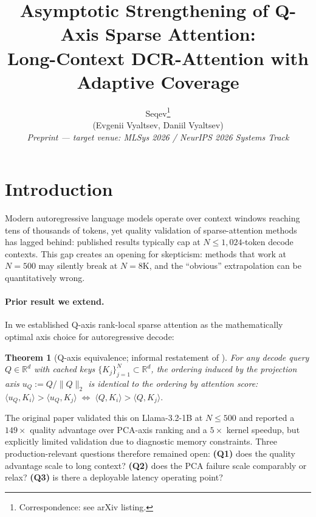 \documentclass[11pt]{article}
\title{
  \large \bfseries
  Asymptotic Strengthening of Q-Axis Sparse Attention:\\
  Long-Context DCR-Attention with Adaptive Coverage
}
\author{%
  Seqev\thanks{Correspondence: see arXiv listing.} \\
  \normalsize (Evgenii Vyaltsev, Daniil Vyaltsev) \\[2pt]
  \small\itshape Preprint --- target venue: MLSys 2026 / NeurIPS 2026 Systems Track
}
\date{}
\newtheorem{theorem}{Theorem}
\theoremstyle{definition}
\theoremstyle{remark}
\theoremstyle{plain}
\newcommand{\R}{\mathbb{R}}
\begin{document}
\maketitle



\section{Introduction}

Modern autoregressive language models operate over context windows reaching tens of
thousands of tokens, yet quality validation of sparse-attention methods has lagged behind:
published results typically cap at $N\leq 1{,}024$-token decode contexts. This gap creates an opening for skepticism: methods that work at $N\!=\!500$ may silently
break at $N\!=\!8\text{K}$, and the ``obvious'' extrapolation can be quantitatively wrong.

\paragraph{Prior result we extend.}
In \citet{seqev2025qaxis} we established Q-axis rank-local sparse attention as the
mathematically optimal axis choice for autoregressive decode:
\begin{theorem}[Q-axis equivalence; informal restatement of {\citealp[Thm.~1]{seqev2025qaxis}}]
  \label{thm:qaxis}
  For any decode query $Q\in\R^d$ with cached keys $\{K_j\}_{j=1}^N\subset\R^d$,
  the ordering induced by the projection axis $u_Q := Q/\|Q\|_2$ is identical to
  the ordering by attention score:
  $
    \langle u_Q, K_i\rangle > \langle u_Q, K_j\rangle
    \;\Longleftrightarrow\;
    \langle Q, K_i\rangle > \langle Q, K_j\rangle .
  $
\end{theorem}
The original paper validated this on Llama-3.2-1B at $N\!\leq\!500$ and reported a
$149\times$ quality advantage over PCA-axis ranking and a $5\times$ kernel speedup,
but explicitly limited validation due to diagnostic memory constraints. Three
production-relevant questions therefore remained open:
\textbf{(Q1)} does the quality advantage scale to long context? \textbf{(Q2)} does the
PCA failure scale comparably or relax? \textbf{(Q3)} is there a deployable latency
operating point?
\end{document}
